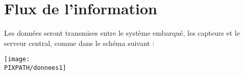 \section{Flux de l'information} 

Les données seront transmises entre le système embarqué, les capteurs et le serveur central, comme dans le schéma suivant : \\

    \begin{center}
    \texttt{[image: \\PIXPATH/donnees1]}
    \end{center}
